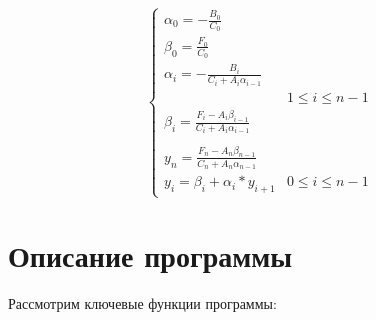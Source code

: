 \documentclass[a4paper,12pt,titlepage,finall]{article}
\begin{document}
\bigskip
\begin{minipage}{\linewidth}
\begin{equation*}
\begin{cases}
\alpha_{0}=-\frac{B_{0}}{C_{0}}\\
\beta_{0}=\frac{F_{0}}{C_{0}}\\
\alpha_{i}=-\frac{B_{i}}{C_{i} + A_{i}\alpha_{i-1}}\\
& 1 \leq i \leq n-1\\
\beta_{i}=\frac{F_{i} - A_{i}\beta_{i-1}}{C_{i} + A_{i}\alpha_{i-1}}\\
\\
y_{n}=\frac{F_{n} - A_{n}\beta_{n-1}}{C_{n} + A_{n}\alpha_{n-1}}\\
y_{i}=\beta_{i}+\alpha_{i} *y_{i+1} & 0 \leq i \leq n-1
\end{cases}
\end{equation*}
\end{minipage}


\newpage

\section{Описание программы}
Рассмотрим ключевые функции программы:\\
\end{document}
